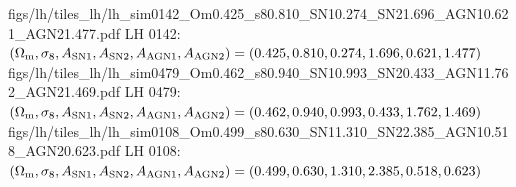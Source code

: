 \documentclass[usenatbib]{mnras}
\newcommand{\FILL}[1]{\textcolor{red}{\textbf{[#1]}}}
\newcommand{\Mcdm}{M_{\rm cdm}}
\newcommand{\Mgas}{M_{\rm gas}}
\newcommand{\Tgas}{T}
\newcommand{\Om}{\Omega_{\rm m}}
\newcommand{\sig}{\sigma_8}
\begin{document}
\clearpage
\begin{center}
\vspace*{\fill}
\AppendixLHTile
  {figs/lh/tiles_lh/lh_sim0142_Om0.425_s80.810_SN10.274_SN21.696_AGN10.621_AGN21.477.pdf}
  {LH 0142: $(\Om,\sig,A_{\rm SN1},A_{\rm SN2},A_{\rm AGN1},A_{\rm AGN2})
  =(0.425,0.810,0.274,1.696,0.621,1.477)$}
\AppendixLHTile
  {figs/lh/tiles_lh/lh_sim0479_Om0.462_s80.940_SN10.993_SN20.433_AGN11.762_AGN21.469.pdf}
  {LH 0479: $(\Om,\sig,A_{\rm SN1},A_{\rm SN2},A_{\rm AGN1},A_{\rm AGN2})
  =(0.462,0.940,0.993,0.433,1.762,1.469)$}
\AppendixLHTile
  {figs/lh/tiles_lh/lh_sim0108_Om0.499_s80.630_SN11.310_SN22.385_AGN10.518_AGN20.623.pdf}
  {LH 0108: $(\Om,\sig,A_{\rm SN1},A_{\rm SN2},A_{\rm AGN1},A_{\rm AGN2})
  =(0.499,0.630,1.310,2.385,0.518,0.623)$}
\vspace*{\fill}
\end{center}



\end{document}
